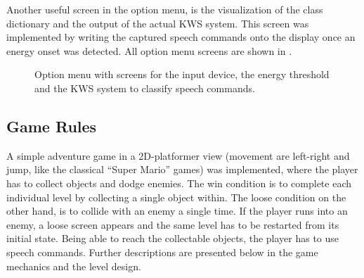 Another useful screen in the option menu, is the visualization of the class dictionary and the output of the actual KWS system.
This screen was implemented by writing the captured speech commands onto the display once an energy onset was detected.
All option menu screens are shown in .
\begin{figure}[!ht]
  \centering
  \qquad
  \qquad
  \caption{Option menu with screens for the input device, the energy threshold and the KWS system to classify speech commands.}
  \label{fig:game_design_menu_options}
\end{figure}
\FloatBarrier
\noindent



\subsection{Game Rules}\label{sec:game_design_rules}
A simple adventure game in a 2D-platformer view (movement are left-right and jump, like the classical \enquote{Super Mario} games) was implemented, where the player has to collect objects and dodge enemies.
The win condition is to complete each individual level by collecting a single object within. 
The loose condition on the other hand, is to collide with an enemy a single time.
If the player runs into an enemy, a loose screen appears and the same level has to be restarted from its initial state.
Being able to reach the collectable objects, the player has to use speech commands.
Further descriptions are presented below in the game mechanics and the level design.


